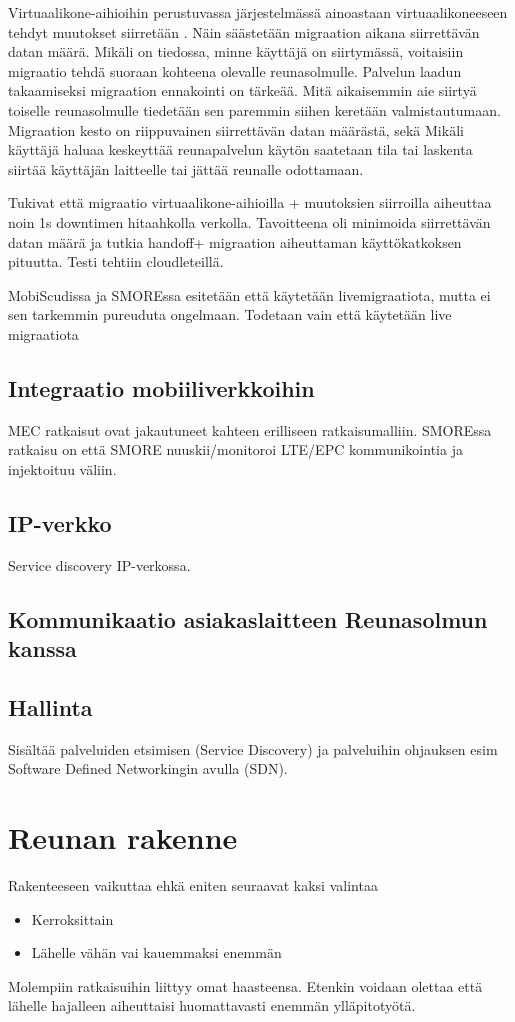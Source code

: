 \documentclass[finnish]{tktltiki2}
\theoremstyle{definition}
\theoremstyle{remark}
\begin{document}
Virtuaalikone-aihioihin perustuvassa järjestelmässä ainoastaan virtuaalikoneeseen tehdyt muutokset siirretään \cite{satya09}. Näin säästetään migraation aikana siirrettävän datan määrä.
Mikäli on tiedossa, minne käyttäjä on siirtymässä, voitaisiin migraatio tehdä suoraan kohteena olevalle reunasolmulle.
Palvelun laadun takaamiseksi migraation ennakointi on tärkeää. Mitä aikaisemmin aie siirtyä toiselle reunasolmulle tiedetään sen paremmin siihen keretään valmistautumaan. 
Migraation kesto on riippuvainen siirrettävän datan määrästä, sekä
Mikäli käyttäjä haluaa keskeyttää reunapalvelun käytön saatetaan tila tai laskenta siirtää käyttäjän laitteelle tai jättää reunalle odottamaan.

\cite{ha2015adaptive} Tukivat että migraatio virtuaalikone-aihioilla + muutoksien siirroilla aiheuttaa noin 1s downtimen hitaahkolla verkolla. Tavoitteena oli minimoida siirrettävän datan määrä ja tutkia handoff+ migraation aiheuttaman käyttökatkoksen pituutta. Testi tehtiin cloudleteillä.

MobiScudissa ja SMOREssa esitetään että käytetään livemigraatiota, mutta ei sen tarkemmin pureuduta ongelmaan. Todetaan vain että käytetään live migraatiota
\subsection{Integraatio mobiiliverkkoihin}
MEC ratkaisut ovat jakautuneet kahteen erilliseen ratkaisumalliin. 
SMOREssa ratkaisu on että SMORE nuuskii/monitoroi LTE/EPC kommunikointia ja injektoituu väliin.

\subsection{IP-verkko}
Service discovery IP-verkossa.
\subsection{Kommunikaatio asiakaslaitteen Reunasolmun kanssa}
\subsection{Hallinta}
Sisältää palveluiden etsimisen (Service Discovery) ja palveluihin ohjauksen esim Software Defined Networkingin avulla (SDN).

\section{Reunan rakenne}
Rakenteeseen vaikuttaa ehkä eniten seuraavat kaksi valintaa
\begin{itemize}
\item Kerroksittain
\item Lähelle vähän vai kauemmaksi enemmän
\end{itemize}
Molempiin ratkaisuihin liittyy omat haasteensa. Etenkin voidaan olettaa että lähelle hajalleen aiheuttaisi huomattavasti enemmän ylläpitotyötä.
\end{document}

